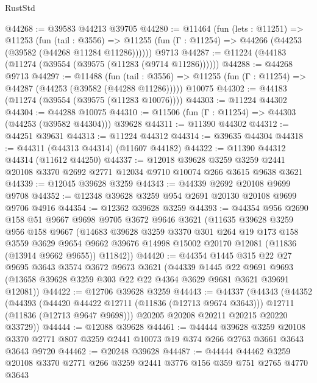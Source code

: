 \begin{lexlean}{RustStd}
\begin{coremodule}
@44268 := @39583 @44213 @39705
@44280 := @11464
    (fun (lets : @11251) =>
    @11253
      (fun (tail : @3556) =>
      @11255 (fun (Γ : @11254) => @44266 (@44253 (@39582 (@44268 @11284 @11286))))))
    @9713
@44287 := @11224 (@44183 (@11274 (@39554 (@39575 (@11283 (@9714 @11286))))))
@44288 := @44268 @9713
@44297 := @11488
    (fun (tail : @3556) => @11255 (fun (Γ : @11254) => @44287 (@44253 (@39582 (@44288 @11286)))))
    @10075
@44302 := @44183 (@11274 (@39554 (@39575 (@11283 @10076))))
@44303 := @11224 @44302
@44304 := @44288 @10075
@44310 := @11506 (fun (Γ : @11254) => @44303 (@44253 (@39582 @44304))) @39628
@44311 := @11390 @44302
@44312 := @44251 @39631
@44313 := @11224 @44312
@44314 := @39635 @44304
@44318 := @44311 (@44313 @44314) (@11607 @44182)
@44322 := @11390 @44312 @44314 (@11612 @44250)
@44337 := @12018
    @39628
    @3259
    @3259
    @2441
    @20108
    @3370
    @2692
    @2771
    @12034
    @9710
    @10074
    @266
    @3615
    @9638
    @3621
@44339 := @12045 @39628 @3259
@44343 := @44339 @2692 @20108 @9699 @9708
@44352 := @12348 @39628 @3259 @954 @2691 @20130 @20108 @9699 @9706 @4916
@44354 := @12362 @39628 @3259
@44393 := @44354
    @956
    @2690
    @158
    @51
    @9667
    @9698
    @9705
    @3672
    @9646
    @3621
    (@11635
      @39628
      @3259
      @956
      @158
      @9667
      (@14683
        @39628
        @3259
        @3370
        @301
        @264
        @19
        @173
        @158
        @3559
        @3629
        @9654
        @9662
        @39676
        @14998
        @15002
        @20170
        @12081
        (@11836 (@13914 @9662 @9655))
        @11842))
@44420 := @44354
    @1445
    @315
    @22
    @27
    @9695
    @3643
    @3574
    @3672
    @9673
    @3621
    (@44339
      @1445
      @22
      @9691
      @9693
      (@13658 @39628 @3259 @303 @22 @22 @4364 @3629 @9681 @3621 @39691 @12081))
@44422 := @12706 @39628 @3259
@44443 := @44337
    (@44343
      (@44352
        (@44393
          (@44420 @44422 @12711 (@11836 (@12713 @9674 @3643)))
          @12711
          (@11836 (@12713 @9647 @9698)))
        @20205
        @20208
        @20211
        @20215
        @20220
        @33729))
@44444 := @12088 @39628
@44461 := @44444
    @39628
    @3259
    @20108
    @3370
    @2771
    @807
    @3259
    @2441
    @10073
    @19
    @374
    @266
    @2763
    @3661
    @3643
    @3643
    @9720
@44462 := @20248 @39628
@44487 := @44444
    @44462
    @3259
    @20108
    @3370
    @2771
    @266
    @3259
    @2441
    @3776
    @156
    @359
    @751
    @2765
    @4770
    @3643

\end{coremodule}
\end{lexlean}
